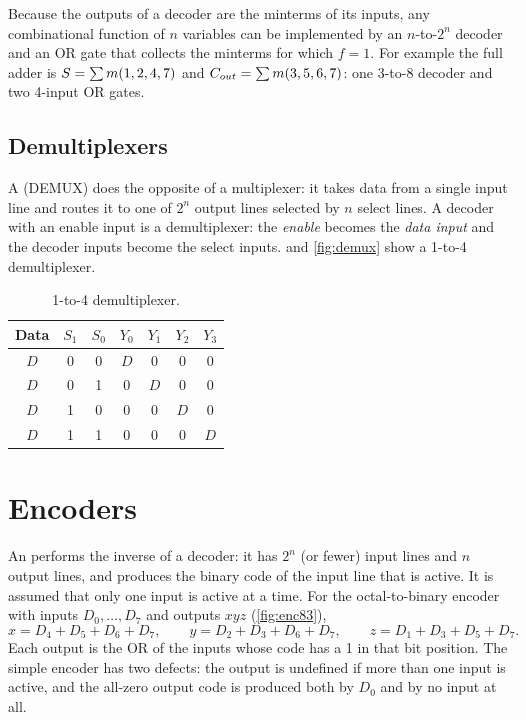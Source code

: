 \begin{keypoint}
Because the outputs of a decoder are the minterms of its inputs, any combinational function of $n$ variables can be implemented by an $n$-to-$2^n$ decoder and an OR gate that collects the minterms for which $f=1$. For example the full adder is $S=\sum m(1,2,4,7)$ and $C_{out}=\sum m(3,5,6,7)$: one 3-to-8 decoder and two 4-input OR gates.
\end{keypoint}

\subsection{Demultiplexers}
A  (DEMUX) does the opposite of a multiplexer: it takes data from a single input line and routes it to one of $2^n$ output lines selected by $n$ select lines. A decoder with an enable input is a demultiplexer: the \emph{enable} becomes the \emph{data input} and the decoder inputs become the select inputs.  and \cref{fig:demux} show a 1-to-4 demultiplexer.

\begin{table}[htbp]
\centering
\caption{1-to-4 demultiplexer.}
\label{tab:demux}
\begin{tabular}{c|cc|cccc}
\toprule
Data&$S_1$&$S_0$&$Y_0$&$Y_1$&$Y_2$&$Y_3$\\ \midrule
$D$&0&0&$D$&0&0&0\\ $D$&0&1&0&$D$&0&0\\ $D$&1&0&0&0&$D$&0\\ $D$&1&1&0&0&0&$D$\\ \bottomrule
\end{tabular}
\end{table}


\section{Encoders}\label{sec:encoders}
An  performs the inverse of a decoder: it has $2^n$ (or fewer) input lines and $n$ output lines, and produces the binary code of the input line that is active. It is assumed that only one input is active at a time. For the octal-to-binary encoder with inputs $D_0,\dots,D_7$ and outputs $xyz$ (\cref{fig:enc83}),
\[
 x = D_4+D_5+D_6+D_7,\qquad y = D_2+D_3+D_6+D_7,\qquad z = D_1+D_3+D_5+D_7 .
\]
Each output is the OR of the inputs whose code has a 1 in that bit position. The simple encoder has two defects: the output is undefined if more than one input is active, and the all-zero output code is produced both by $D_0$ and by no input at all.

